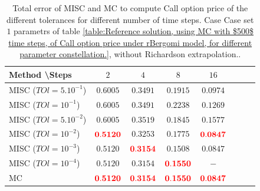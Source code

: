 \documentclass[11pt]{article}
\begin{document}
\begin{table}[h!]
	\centering
	\begin{tabular}{l*{6}{c}r}
		Method \textbackslash  Steps            & $2$ & $4$ & $8$ & $16$  \\
		\hline
		MISC ($TOl=5.10^{-1}$)  & $\mathbf{0.6005}$ & $\mathbf{0.3491}$ & $\mathbf{ 0.1915}$ & $\mathbf{ 0.0974}$  \\
		MISC ($TOl=10^{-1}$)  & $\mathbf{ 0.6005}$ & $\mathbf{ 0.3491}$ & $\mathbf{  0.2238}$ & $\mathbf{
			0.1269}$  \\
		MISC ($TOl=5.10^{-2}$)  &$\mathbf{0.6005}$ & $\mathbf{  0.3519}$ & $\mathbf{ 0.1845}$ & $\mathbf{  0.1577}$  \\
		MISC ($TOl=10^{-2}$)  & $\mathbf{{\color{red}0.5120}}$ & $\mathbf{0.3253}$ & $\mathbf{ 0.1775}$ & $\mathbf{  {\color{red}0.0847}}$  \\
		MISC ($TOl=10^{-3}$)  & $\mathbf{0.5120}$ & $\mathbf{{\color{red}0.3154}}$ & $\mathbf{0.1508}$ & $\mathbf{0.0847}$  \\
		MISC ($TOl=10^{-4}$)  & $\mathbf{0.5120}$ & $\mathbf{0.3154}$ & $\mathbf{{\color{red}0.1550}}$ & $\mathbf{-}$  \\
		\hline
		MC     & $\mathbf{{\color{red}0.5120}}$ & $\mathbf{{\color{red}0.3154}}$ & $\mathbf{{\color{red}0.1550}}$ &$\mathbf{  {\color{red}0.0847}}$  \\	
%		
		
		\hline
	\end{tabular}
	\caption{Total error of MISC and MC to compute Call option price of the different tolerances for different number of time steps. Case Case set $1$ parametrs of table \ref{table:Reference solution, using MC with $500$ time steps, of Call option price under rBergomi model, for different parameter constellation.}, without Richardson extrapolation..}
	\label{Total error of MISC and MC to compute Call option price of the different tolerances for different number of time steps. Case set 1, without Richardson extrapolation. The numbers between parentheses are the corresponding absolute errors.}
\end{table}
\end{document}
